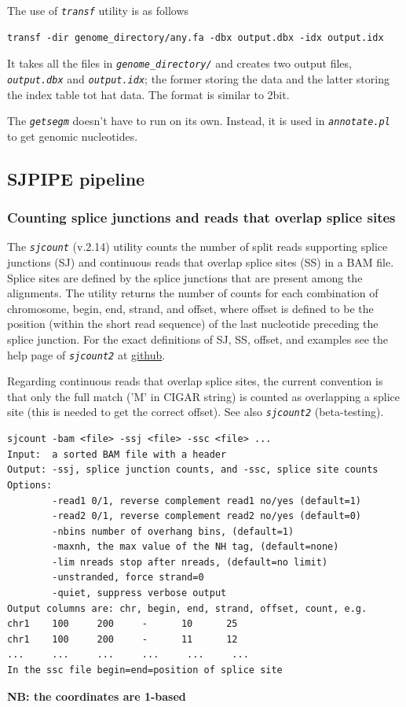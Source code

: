 \documentclass{article}
\newcommand{\prog}[1]{{\tt\em #1}}
\begin{document}
The use of \prog{transf} utility is as follows
\begin{verbatim} 
transf -dir genome_directory/any.fa -dbx output.dbx -idx output.idx
\end{verbatim}

It takes all the files in \prog{genome\_directory/} and creates two output files, \prog{output.dbx} and \prog{output.idx}; the former storing the data and the latter 
storing the index table tot hat data. The format is similar to 2bit. 

The \prog{getsegm} doesn't have to run on its own. Instead, it is used in \prog{annotate.pl} to get genomic nucleotides.



\subsection{SJPIPE pipeline}

\subsubsection{Counting splice junctions and reads that overlap splice sites}
The \prog{sjcount} (v.2.14) utility counts the number of split reads supporting splice junctions (SJ) and continuous reads that overlap splice sites (SS) in a BAM file.
Splice sites are defined by the splice junctions that are present among the alignments. The utility returns the number of counts for each combination of chromosome, begin, 
end, strand, and offset, where offset is defined to be the position (within the short read sequence) of the last nucleotide preceding the splice junction. 
For the exact definitions of SJ, SS, offset, and examples see the help page of \prog{sjcount2} at \href{https://github.com/pervouchine/sjcount}{github}. 

Regarding continuous reads that overlap splice sites, the current convention is that only the full match ('M' in CIGAR string) is counted as overlapping a splice site 
(this is needed to get the correct offset). See also \prog{sjcount2} (beta-testing).
\begin{verbatim}
sjcount -bam <file> -ssj <file> -ssc <file> ...
Input:  a sorted BAM file with a header
Output: -ssj, splice junction counts, and -ssc, splice site counts 
Options:
        -read1 0/1, reverse complement read1 no/yes (default=1)
        -read2 0/1, reverse complement read2 no/yes (default=0)
        -nbins number of overhang bins, (default=1)
        -maxnh, the max value of the NH tag, (default=none)
        -lim nreads stop after nreads, (default=no limit)
        -unstranded, force strand=0
        -quiet, suppress verbose output
Output columns are: chr, begin, end, strand, offset, count, e.g.
chr1    100     200     -      10      25
chr1    100     200     -      11      12
...     ...     ...     ...     ...     ...
In the ssc file begin=end=position of splice site
\end{verbatim}
{\bf NB: the coordinates are 1-based}
\end{document}
